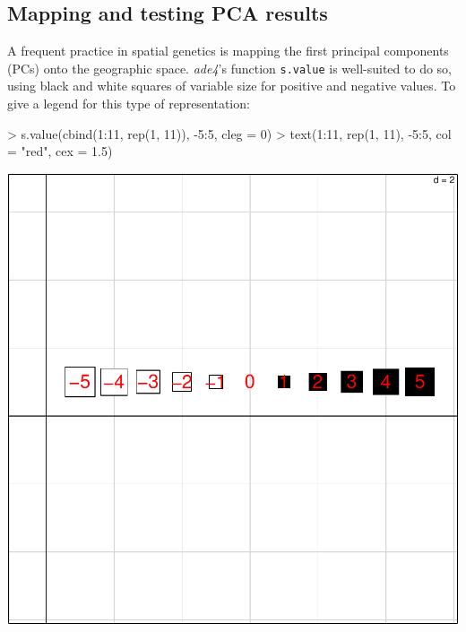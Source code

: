 \documentclass{article}
\begin{document}
\subsection{Mapping and testing PCA results}
A frequent practice in spatial genetics is mapping the first principal components (PCs) onto the geographic space.
\textit{ade4}'s function \texttt{s.value} is well-suited to do so, using black and
white squares of variable size for positive and negative values.
To give a legend for this type of representation:
\begin{Schunk}
\begin{Sinput}
> s.value(cbind(1:11, rep(1, 11)), -5:5, cleg = 0)
> text(1:11, rep(1, 11), -5:5, col = "red", cex = 1.5)
\end{Sinput}
\end{Schunk}
\includegraphics{figs/spca-svaluedem}
\end{document}
